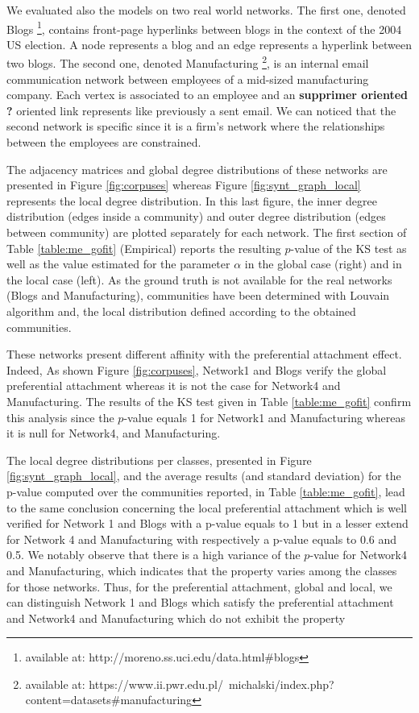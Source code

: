 We evaluated also the models on two real world networks.
The first one, denoted Blogs \footnote{available at: http://moreno.ss.uci.edu/data.html\#blogs}, contains front-page hyperlinks between blogs in the context of the 2004 US election. A node represents a blog and an edge represents a hyperlink between two blogs.
The second one, denoted Manufacturing \footnote{available at: https://www.ii.pwr.edu.pl/~michalski/index.php?content=datasets\#manufacturing}, is an internal email communication network between employees of a mid-sized manufacturing company. Each vertex is associated  to an employee and an \textbf{supprimer oriented ?} oriented link represents like previously a sent email. We can noticed that the second network is specific since it is a firm's network where the relationships between the employees are constrained. 


The adjacency matrices and global degree distributions of these networks are presented in Figure \ref{fig:corpuses} whereas Figure \ref{fig:synt_graph_local} represents the local degree distribution. In this last figure, the inner degree distribution (edges inside a community) and outer degree distribution (edges between community) are plotted separately for each network. The first section of Table \ref{table:me_gofit} (Empirical) reports the resulting $p$-value of the KS test as well as the value estimated for the parameter  $\alpha$ in the global case (right) and in the local case (left). As the ground truth is not available for the real networks (Blogs and Manufacturing), communities have been determined with Louvain algorithm \cite{Blondel2008} and, the local distribution defined according to the obtained communities. 

These networks present  different affinity with the preferential attachment effect.
Indeed, As shown Figure \ref{fig:corpuses}, Network1 and Blogs verify the  global preferential attachment whereas it is not the case for Network4 and Manufacturing. The results of the KS test given in Table \ref{table:me_gofit} confirm this analysis since the $p$-value equals 1 for Network1 and Manufacturing whereas it is null for Network4, and Manufacturing.

The local degree distributions per classes, presented in Figure \ref{fig:synt_graph_local}, and the average results (and standard deviation) for the p-value computed over the communities reported, in Table \ref{table:me_gofit}, lead to the same conclusion concerning the local preferential attachment which is well verified for Network 1 and Blogs with a p-value equals to 1 but in a lesser extend for Network 4 and Manufacturing with respectively a p-value equals to 0.6 and 0.5. We notably observe that there is a high variance of the $p$-value for Network4 and Manufacturing, which indicates that the property varies among the classes for those networks. Thus, for the preferential attachment, global and local, we can distinguish Network 1 and Blogs which satisfy the preferential attachment and Network4 and Manufacturing which do not exhibit the property

